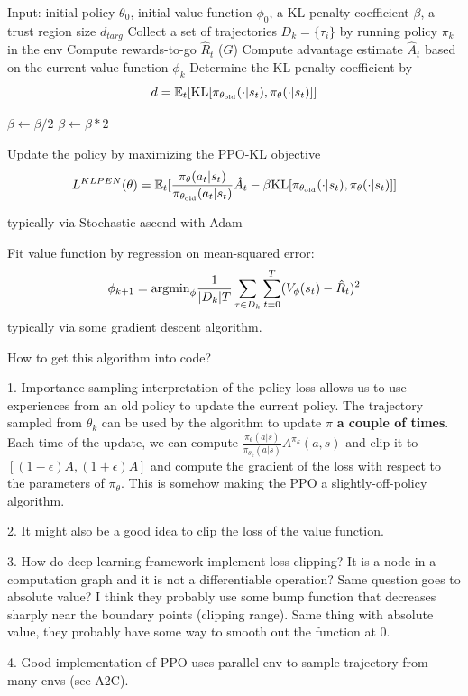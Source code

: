 \documentclass{article}
\begin{document}
\begin{algorithmic}[2]
\STATE Input: initial policy $\theta_0$, initial value function $\phi_0$,
a KL penalty coefficient $\beta$, a trust region size $d_{targ}$
\STATE Collect a set of trajectories $D_k = \{\tau_i\}$ by running policy
$\pi_k$ in the env
\STATE Compute rewards-to-go $\hat R_t$ ($G$)
\STATE Compute advantage estimate $\hat A_t$ based on the current
value function $\phi_k$
\STATE Determine the KL penalty coefficient by
\[
d = \mathbb{E}_t[\text{KL}[\pi_{\theta_{\text{old}}}(\cdot | s_t), \pi_{\theta}(\cdot | s_t)]]
\]

    \STATE $\beta \leftarrow  \beta / 2$
    \STATE $\beta \leftarrow \beta *2 $
\ENDIF

\STATE Update the policy by maximizing the PPO-KL objective
\[
L^{KLPEN}(\theta) = \mathbb{E}_{t}[
\frac{\pi_{\theta}(a_t|s_t)}{\pi_{\theta_{\text{old}}}(a_t | s_t)}\hat A_t
- \beta \text{KL}[\pi_{\theta_{\text{old}}}(\cdot | s_t), \pi_{\theta}(\cdot|s_t)]
]
\]

typically via Stochastic ascend with Adam

\STATE Fit value function by regression on mean-squared error:
\[
\phi_{k+1} = \text{argmin}_{\phi}\frac{1}{|D_k|T}
\sum_{\tau \in D_k}\sum_{t=0}^T(V_{\phi}(s_t) - \hat R_t)^2
\]
typically via some gradient descent algorithm. 
\ENDFOR
\end{algorithmic}


How to get this algorithm into code?

1. Importance sampling interpretation of the policy loss allows us to use experiences 
from an old policy to update the current policy. The trajectory sampled from
$\theta_k$ can be used by the algorithm to update $\pi$ \textbf{a couple of times}. 
Each time of the update, we can compute 
$\frac{\pi_{\theta}(a|s)}{\pi_{\theta_k}(a|s)}A^{\pi_k}(a, s)$ and clip it to 
$[(1-\epsilon)A, (1 + \epsilon)A]$ and compute the gradient of the loss with 
respect to the parameters of $\pi_{\theta}$. This is somehow making the PPO a 
slightly-off-policy algorithm.

2. It might also be a good idea to clip the loss of the value function. 

3. How do deep learning framework implement loss clipping? It is a node 
in a computation graph and it is not a differentiable operation? Same 
question goes to absolute value? I think they probably use some bump
function that decreases sharply near the boundary points (clipping range).
Same thing with absolute value, they probably have some way to smooth
out the function at 0.

4. Good implementation of PPO uses parallel env to sample trajectory 
from many envs (see A2C). 
\end{document}
